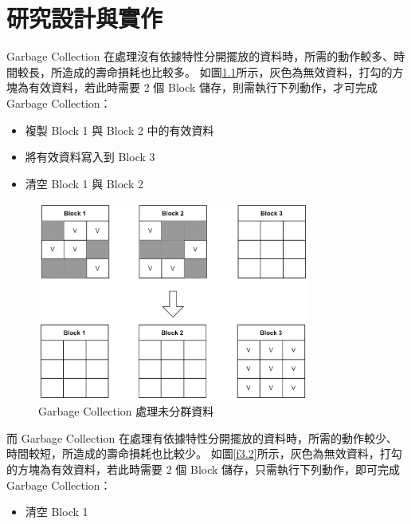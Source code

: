 \chapter{研究設計與實作}
\indent
Garbage Collection 在處理沒有依據特性分開擺放的資料時，所需的動作較多、時間較長，所造成的壽命損耗也比較多。
如圖\ref{f3.1}所示，灰色為無效資料，打勾的方塊為有效資料，若此時需要 2 個 Block 儲存，則需執行下列動作，才可完成 Garbage Collection：

\begin{itemize}
    \item 複製 Block 1 與 Block 2 中的有效資料
    \item 將有效資料寫入到 Block 3
    \item 清空 Block 1 與 Block 2
\end{itemize}

\begin{figure}[H]
    \centering
    \includegraphics[width=0.8\textwidth]{picture/ch3/gc_efficiency_1.png}
    \caption{Garbage Collection 處理未分群資料}
    \label{f3.1}
\end{figure}

\indent
而 Garbage Collection 在處理有依據特性分開擺放的資料時，所需的動作較少、時間較短，所造成的壽命損耗也比較少。
如圖\ref{f3.2}所示，灰色為無效資料，打勾的方塊為有效資料，若此時需要 2 個 Block 儲存，只需執行下列動作，即可完成 Garbage Collection：

\begin{itemize}
    \item 清空 Block 1
\end{itemize}


